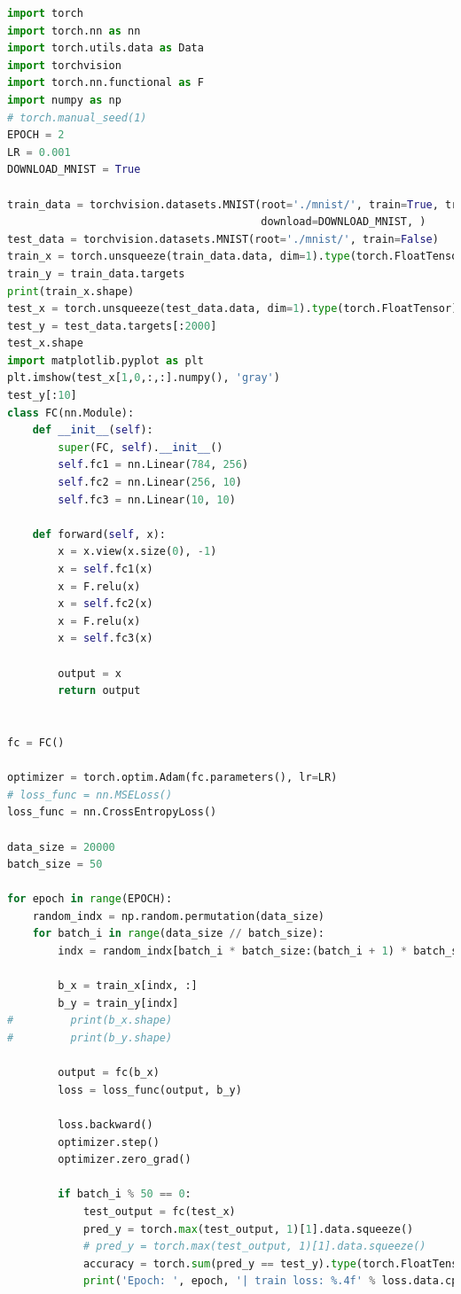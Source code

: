 \documentclass[11pt,UTF8]{ctexart}
\begin{document}
	\begin{lstlisting}[language={python}]
import torch
import torch.nn as nn
import torch.utils.data as Data
import torchvision
import torch.nn.functional as F
import numpy as np
# torch.manual_seed(1)
EPOCH = 2
LR = 0.001
DOWNLOAD_MNIST = True

train_data = torchvision.datasets.MNIST(root='./mnist/', train=True, transform=torchvision.transforms.ToTensor(),
                                        download=DOWNLOAD_MNIST, )
test_data = torchvision.datasets.MNIST(root='./mnist/', train=False)
train_x = torch.unsqueeze(train_data.data, dim=1).type(torch.FloatTensor) / 255.
train_y = train_data.targets
print(train_x.shape)
test_x = torch.unsqueeze(test_data.data, dim=1).type(torch.FloatTensor)[:2000] / 255.  # Tensor on GPU
test_y = test_data.targets[:2000]
test_x.shape
import matplotlib.pyplot as plt
plt.imshow(test_x[1,0,:,:].numpy(), 'gray')
test_y[:10]
class FC(nn.Module):
    def __init__(self):
        super(FC, self).__init__()
        self.fc1 = nn.Linear(784, 256)
        self.fc2 = nn.Linear(256, 10)
        self.fc3 = nn.Linear(10, 10)

    def forward(self, x):
        x = x.view(x.size(0), -1)
        x = self.fc1(x)
        x = F.relu(x)
        x = self.fc2(x)
        x = F.relu(x)
        x = self.fc3(x)

        output = x
        return output


fc = FC()

optimizer = torch.optim.Adam(fc.parameters(), lr=LR)
# loss_func = nn.MSELoss()
loss_func = nn.CrossEntropyLoss()

data_size = 20000
batch_size = 50

for epoch in range(EPOCH):
    random_indx = np.random.permutation(data_size)
    for batch_i in range(data_size // batch_size):
        indx = random_indx[batch_i * batch_size:(batch_i + 1) * batch_size]

        b_x = train_x[indx, :]
        b_y = train_y[indx]
#         print(b_x.shape)
#         print(b_y.shape)

        output = fc(b_x)
        loss = loss_func(output, b_y)

        loss.backward()
        optimizer.step()
        optimizer.zero_grad()

        if batch_i % 50 == 0:
            test_output = fc(test_x)
            pred_y = torch.max(test_output, 1)[1].data.squeeze()
            # pred_y = torch.max(test_output, 1)[1].data.squeeze()
            accuracy = torch.sum(pred_y == test_y).type(torch.FloatTensor) / test_y.size(0)
            print('Epoch: ', epoch, '| train loss: %.4f' % loss.data.cpu().numpy(), '| test accuracy: %.3f' % accuracy)


\end{lstlisting}
\end{document}

